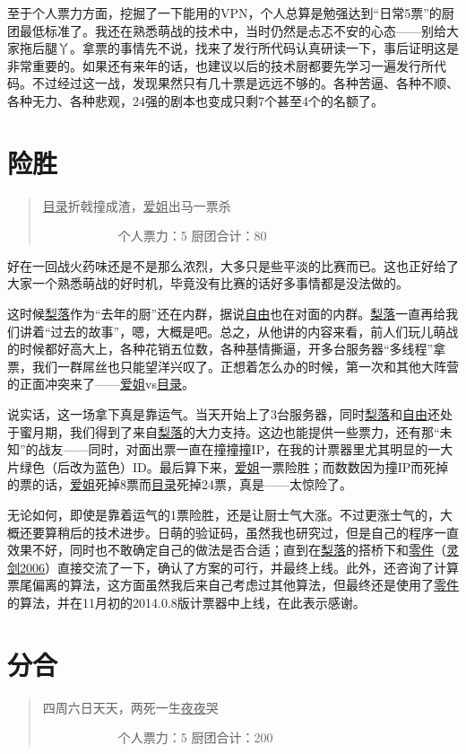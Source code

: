至于个人票力方面，挖掘了一下能用的VPN，个人总算是勉强达到“日常5票”的厨团最低标准了。我还在熟悉萌战的技术中，当时仍然是忐忑不安的心态——别给大家拖后腿丫。拿票的事情先不说，找来了发行所代码认真研读一下，事后证明这是非常重要的。如果还有来年的话，也建议以后的技术厨都要先学习一遍发行所代码。不过经过这一战，发现果然只有几十票是远远不够的。各种苦逼、各种不顺、各种无力、各种悲观，24强的剧本也变成只剩7个甚至4个的名额了。


\chapter{险胜}
\begin{quote}
\uline{目录}折戟撞成渣，\uline{爱姐}出马一票杀

　　　　　　个人票力：5 厨团合计：80
\end{quote}

好在一回战火药味还是不是那么浓烈，大多只是些平淡的比赛而已。这也正好给了大家一个熟悉萌战的好时机，毕竟没有比赛的话好多事情都是没法做的。

这时候\uline{梨落}作为“去年的厨”还在内群，据说\uline{自由}也在对面的内群。\uline{梨落}一直再给我们讲着“过去的故事”，嗯，大概是吧。总之，从他讲的内容来看，前人们玩儿萌战的时候都好高大上，各种花销五位数，各种基情撕逼，开多台服务器“多线程”拿票，我们一群屌丝也只能望洋兴叹了。正想着怎么办的时候，第一次和其他大阵营的正面冲突来了——\uline{爱姐}vs\uline{目录}。

说实话，这一场拿下真是靠运气。当天开始上了3台服务器，同时\uline{梨落}和\uline{自由}还处于蜜月期，我们得到了来自\uline{梨落}的大力支持。这边也能提供一些票力，还有那“未知”的战友——同时，对面出票一直在撞撞撞IP，在我的计票器里尤其明显的一大片绿色（后改为蓝色）ID。最后算下来，\uline{爱姐}一票险胜；而数数因为撞IP而死掉的票的话，\uline{爱姐}死掉8票而\uline{目录}死掉24票，真是——太惊险了。

无论如何，即使是靠着运气的1票险胜，还是让厨士气大涨。不过更涨士气的，大概还要算稍后的技术进步。日萌的验证码，虽然我也研究过，但是自己的程序一直效果不好，同时也不敢确定自己的做法是否合适；直到在\uline{梨落}的搭桥下和\uline{零件}（\uline{灵剑2006}）直接交流了一下，确认了方案的可行，并最终上线。此外，还咨询了计算票尾偏离的算法，这方面虽然我后来自己考虑过其他算法，但最终还是使用了\uline{零件}的算法，并在11月初的2014.0.8版计票器中上线，在此表示感谢。

\chapter{分合}
\begin{quote}
四周六日天天，两死一生\uline{夜夜}哭

　　　　　　个人票力：5 厨团合计：200
\end{quote}

